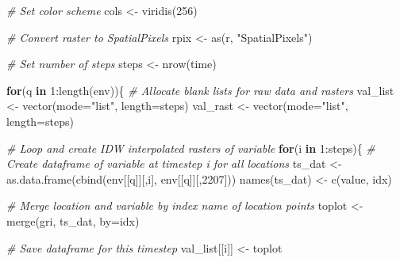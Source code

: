 \documentclass[
]{article}
\newenvironment{Shaded}{\begin{snugshade}}{\end{snugshade}}
\newcommand{\AttributeTok}[1]{\textcolor[rgb]{0.77,0.63,0.00}{#1}}
\newcommand{\CommentTok}[1]{\textcolor[rgb]{0.56,0.35,0.01}{\textit{#1}}}
\newcommand{\ControlFlowTok}[1]{\textcolor[rgb]{0.13,0.29,0.53}{\textbf{#1}}}
\newcommand{\DecValTok}[1]{\textcolor[rgb]{0.00,0.00,0.81}{#1}}
\newcommand{\FunctionTok}[1]{\textcolor[rgb]{0.00,0.00,0.00}{#1}}
\newcommand{\NormalTok}[1]{#1}
\newcommand{\OtherTok}[1]{\textcolor[rgb]{0.56,0.35,0.01}{#1}}
\newcommand{\SpecialCharTok}[1]{\textcolor[rgb]{0.00,0.00,0.00}{#1}}
\newcommand{\StringTok}[1]{\textcolor[rgb]{0.31,0.60,0.02}{#1}}
\begin{document}
\begin{Shaded}
\begin{Highlighting}[]
\CommentTok{\# Set color scheme}
\NormalTok{cols }\OtherTok{\textless{}{-}} \FunctionTok{viridis}\NormalTok{(}\DecValTok{256}\NormalTok{)}

\CommentTok{\# Convert raster to SpatialPixels}
\NormalTok{rpix }\OtherTok{\textless{}{-}} \FunctionTok{as}\NormalTok{(r, }\StringTok{"SpatialPixels"}\NormalTok{)}

\CommentTok{\# Set number of steps}
\NormalTok{steps }\OtherTok{\textless{}{-}} \FunctionTok{nrow}\NormalTok{(time)}

\ControlFlowTok{for}\NormalTok{(q }\ControlFlowTok{in} \DecValTok{1}\SpecialCharTok{:}\FunctionTok{length}\NormalTok{(env))\{}
  \CommentTok{\# Allocate blank lists for raw data and rasters}
\NormalTok{  val\_list }\OtherTok{\textless{}{-}} \FunctionTok{vector}\NormalTok{(}\AttributeTok{mode=}\StringTok{"list"}\NormalTok{, }\AttributeTok{length=}\NormalTok{steps)}
\NormalTok{  val\_rast }\OtherTok{\textless{}{-}} \FunctionTok{vector}\NormalTok{(}\AttributeTok{mode=}\StringTok{"list"}\NormalTok{, }\AttributeTok{length=}\NormalTok{steps)}
  
  \CommentTok{\# Loop and create IDW interpolated rasters of variable}
  \ControlFlowTok{for}\NormalTok{(i }\ControlFlowTok{in} \DecValTok{1}\SpecialCharTok{:}\NormalTok{steps)\{}
    \CommentTok{\# Create dataframe of variable at timestep i for all locations}
\NormalTok{    ts\_dat }\OtherTok{\textless{}{-}}\FunctionTok{as.data.frame}\NormalTok{(}\FunctionTok{cbind}\NormalTok{(env[[q]][,i],}
\NormalTok{                                 env[[q]][,}\DecValTok{2207}\NormalTok{]))}
    \FunctionTok{names}\NormalTok{(ts\_dat) }\OtherTok{\textless{}{-}} \FunctionTok{c}\NormalTok{(}\StringTok{\textquotesingle{}value\textquotesingle{}}\NormalTok{, }\StringTok{\textquotesingle{}idx\textquotesingle{}}\NormalTok{)}
    
    \CommentTok{\# Merge location and variable by index name of location points}
\NormalTok{    toplot }\OtherTok{\textless{}{-}} \FunctionTok{merge}\NormalTok{(gri,}
\NormalTok{                    ts\_dat,}
                    \AttributeTok{by=}\StringTok{\textquotesingle{}idx\textquotesingle{}}\NormalTok{)}
    
    \CommentTok{\# Save dataframe for this timestep}
\NormalTok{    val\_list[[i]] }\OtherTok{\textless{}{-}}\NormalTok{ toplot}
    

\end{Highlighting}
\end{Shaded}
\end{document}
